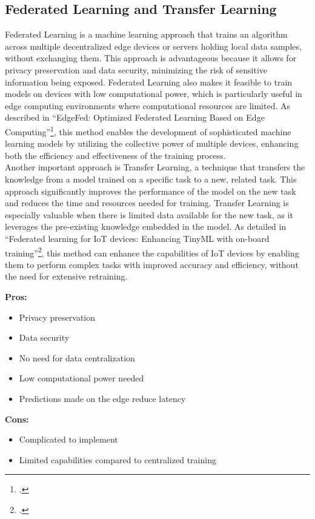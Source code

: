 \subsection{Federated Learning and Transfer Learning}
Federated Learning is a machine learning approach that trains an algorithm across multiple decentralized edge devices or servers holding local data samples, without exchanging them. This approach is advantageous because it allows for privacy preservation and data security, minimizing the risk of sensitive information being exposed. Federated Learning also makes it feasible to train models on devices with low computational power, which is particularly useful in edge computing environments where computational resources are limited. As described in \enquote{EdgeFed: Optimized Federated Learning Based on Edge Computing}\footcite{9260194}, this method enables the development of sophisticated machine learning models by utilizing the collective power of multiple devices, enhancing both the efficiency and effectiveness of the training process.
\\
Another important approach is Transfer Learning, a technique that transfers the knowledge from a model trained on a specific task to a new, related task. This approach significantly improves the performance of the model on the new task and reduces the time and resources needed for training. Transfer Learning is especially valuable when there is limited data available for the new task, as it leverages the pre-existing knowledge embedded in the model. As detailed in \enquote{Federated learning for IoT devices: Enhancing TinyML with on-board training}\footcite{FICCO2024102189}, this method can enhance the capabilities of IoT devices by enabling them to perform complex tasks with improved accuracy and efficiency, without the need for extensive retraining.

\textbf{Pros:}
\begin{itemize}
    \item Privacy preservation
    \item Data security
    \item No need for data centralization
    \item Low computational power needed
    \item Predictions made on the edge reduce latency
\end{itemize}
\textbf{Cons:}
\begin{itemize}
    \item Complicated to implement
    \item Limited capabilities compared to centralized training
\end{itemize}